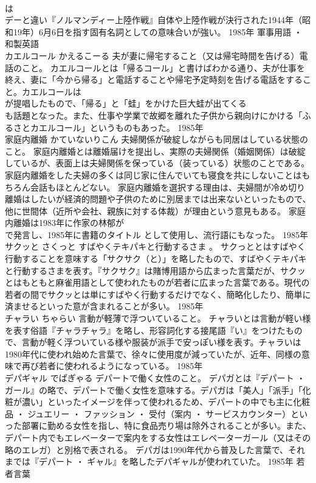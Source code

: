 \documentclass[8pt]{extreport}
\begin{document}
\begin{CJK}{UTF8}{min}
\\	は
\\	デーと違い『ノルマンディー上陸作戦』自体や上陸作戦が決行された1944年（昭和19年）6月6日を指す固有名詞としての意味合いが強い。	1985年	軍事用語 ・ 和製英語	
\\	カエルコール	かえるこーる	夫が妻に帰宅すること（又は帰宅時間を告げる）電話のこと。	カエルコールとは「帰るコール」と書けばわかる通り、夫が仕事を終え、妻に「今から帰る」と電話することや帰宅予定時刻を告げる電話をすること。カエルコールは
\\	が提唱したもので、「帰る」と「蛙」をかけた巨大蛙が出てくる
\\	も話題となった。また、仕事や学業で故郷を離れた子供から親向けにかける「ふるさとカエルコール」というものもあった。	1985年	
\\	家庭内離婚	かていないりこん	夫婦関係が破綻しながらも同居はしている状態のこと。	家庭内離婚とは離婚届けを提出し、実際の夫婦関係（婚姻関係）は破綻しているが、表面上は夫婦関係を保っている（装っている）状態のことである。家庭内離婚をした夫婦の多くは同じ家に住んでいても寝食を共にしないことはもちろん会話もほとんどない。 家庭内離婚を選択する理由は、夫婦間が冷め切り離婚はしたいが経済的問題や子供のために別居までは出来ないといったもので、他に世間体（近所や会社、親族に対する体裁）が理由という意見もある。 家庭内離婚は1983年に作家の林郁が
\\	で発言し、1985年に書籍のタイトル として使用し、流行語にもなった。	1985年	
\\	サクッと	さくっと	すばやくテキパキと行動するさま 。	サクっととはすばやく行動することを意味する「サクサク（と）」を略したもので、すばやくテキパキと行動するさまを表す。『サクサク』は賭博用語から広まった言葉だが、サクッとはもともと麻雀用語として使われたものが若者に広まった言葉である。現代の若者の間でサクッとは単にすばやく行動するだけでなく、簡略化したり、簡単に済ませるといった意が含まれることが多い。	1985年	
\\	チャラい	ちゃらい	言動が軽薄で浮ついていること。	チャラいとは言動が軽い様を表す俗語『チャラチャラ』を略し、形容詞化する接尾語『い』をつけたもので、言動が軽く浮ついている様や服装が派手で安っぽい様を表す。チャラいは1980年代に使われ始めた言葉で、徐々に使用度が減っていたが、近年、同様の意味で再び若者に使われるようになっている。	1985年	
\\	デパギャル	でぱぎゃる	デパートで働く女性のこと。	デパガとは『デパート ・ ガール』の略で、デパートで働く女性を意味する。デパガは「美人」「派手」「化粧が濃い」といったイメージを伴って使われるため、デパートの中でも主に化粧品 ・ ジュエリー ・ ファッション ・ 受付（案内 ・ サービスカウンター）といった部署に勤める女性を指し、特に食品売り場は除外されることが多い。また、デパート内でもエレベーターで案内をする女性はエレベーターガール（又はその略のエレガ）と別格で表される。 デパガは1990年代から普及した言葉で、それまでは『デパート ・ ギャル』を略したデパギャルが使われていた。	1985年	若者言葉	

\end{CJK}
\end{document}

